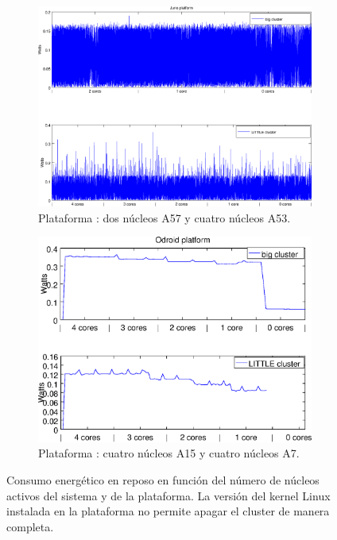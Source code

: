 \begin{figure}
  \centering
  \begin{subfigure}{1.0\textwidth}
    \centering
    \includegraphics[width=0.75\linewidth]{Plots/Modelos_consumo/apagadoJuno.eps}
    \caption{Plataforma \juno: dos núcleos \BIG A57 y cuatro núcleos \LITTLE A53.}
    \end{subfigure}

    \vspace{0.5cm}

    \begin{subfigure}{1.0\textwidth}
      \centering
      \includegraphics[width=0.8\linewidth]{Plots/Modelos_consumo/apagadoOdroid.eps}
      \caption{Plataforma \odroid: cuatro núcleos \BIG A15 y cuatro núcleos \LITTLE A7.}
    \end{subfigure}  
    
  \caption[Consumo energético en función del número de núcleos activos en
  cada cluster]{Consumo energético en reposo en función del número de núcleos
    activos del sistema y de la plataforma. La versión del kernel Linux
    instalada en la plataforma \odroid no permite apagar el cluster
    \LITTLE de manera completa.}
  \label{s5:fig:apagadoCores}
\end{figure}


